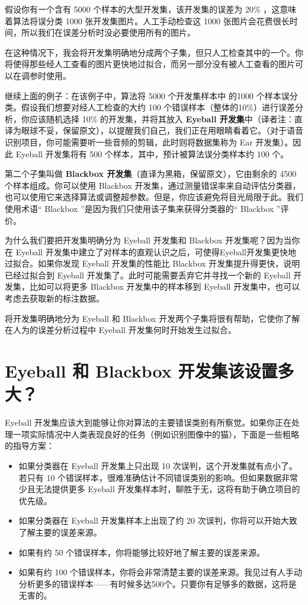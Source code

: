 假设你有一个含有 5000 个样本的大型开发集，该开发集的误差为 20\%
，这意味着算法将误分类 1000 张开发集图片。人工手动检查这 1000
张图片会花费很长时间，所以我们在误差分析时没必要使用所有的图片。

在这种情况下，我会将开发集明确地分成两个子集，但只人工检查其中的一个。你将使得那些经人工查看的图片更快地过拟合，而另一部分没有被人工查看的图片可以在调参时使用。

继续上面的例子：在该例子中，算法将 5000 个开发集样本中 的1000
个样本误分类。假设我们想要对经人工检查的大约 100
个错误样本（整体的10\%）进行误差分析，你应该随机选择 10\%
的开发集，并将其放入 \textbf{Eyeball
开发集}中（译者注：直译为眼球不妥，保留原文），以提醒我们自己，我们正在用眼睛看着它。（对于语音识别项目，你可能需要听一些音频的剪辑，此时则将数据集称为
Ear 开发集）。因此 Eyeball 开发集将有 500
个样本，其中，预计被算法误分类样本约 100 个。

第二个子集叫做 \textbf{Blackbox
开发集}（直译为黑箱，保留原文），它由剩余的 4500 个样本组成。你可以使用
Blackbox
开发集，通过测量错误率来自动评估分类器，也可以使用它来选择算法或调整超参数。但是，你应该避免将目光局限于此。我们使用术语``
Blackbox ''是因为我们只使用该子集来获得分类器的`` Blackbox ''评价。

为什么我们要把开发集明确分为 Eyeball 开发集和 Blackbox
开发集呢？因为当你在 Eyeball
开发集中建立了对样本的直观认识之后，可使得Eyeball开发集更快地过拟合。如果你发现
Eyeball 开发集的性能比 Blackbox 开发集提升得更快，说明已经过拟合到
Eyeball 开发集了。此时可能需要丢弃它并寻找一个新的 Eyeball
开发集，比如可以将更多 Blackbox 开发集中的样本移到 Eyeball
开发集中，也可以考虑去获取新的标注数据。

将开发集明确地分为 Eyeball 和 Blackbox
开发两个子集将很有帮助，它使你了解在人为的误差分析过程中 Eyeball
开发集何时开始发生过拟合。

\hypertarget{eyeball-ux548c-blackbox-ux5f00ux53d1ux96c6ux8be5ux8bbeux7f6eux591aux5927}{%
\chapter{Eyeball 和 Blackbox
开发集该设置多大？}\label{eyeball-ux548c-blackbox-ux5f00ux53d1ux96c6ux8be5ux8bbeux7f6eux591aux5927}}

Eyeball
开发集应该大到能够让你对算法的主要错误类别有所察觉。如果你正在处理一项实际情况中人类表现良好的任务（例如识别图像中的猫），下面是一些粗略的指导方案：

\begin{itemize}
\tightlist
\item
  如果分类器在 Eyeball 开发集上只出现 10
  次误判，这个开发集就有点小了。若只有 10
  个错误样本，很难准确估计不同错误类别的影响。但如果数据非常少且无法提供更多
  Eyeball 开发集样本时，聊胜于无，这将有助于确立项目的优先级。
\item
  如果分类器在 Eyeball 开发集样本上出现了约 20
  次误判，你将可以开始大致了解主要的误差来源。
\item
  如果有约 50 个错误样本，你将能够比较好地了解主要的误差来源。
\item
  如果有约 100
  个错误样本，你将会非常清楚主要的误差来源。我见过有人手动分析更多的错误样本------有时候多达500个。只要你有足够多的数据，这将是无害的。
\end{itemize}

